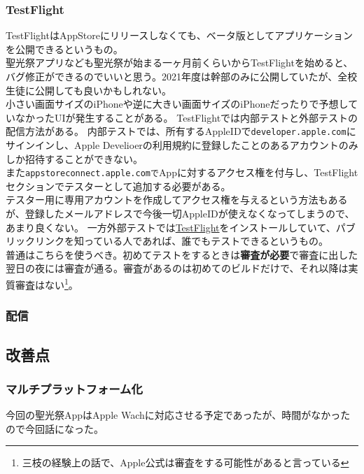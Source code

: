 \documentclass[dvipdfmx,jb5]{jarticle}
\newcommand{\impact}[1]{\textbf{\gtfamily #1}}
\newcommand{\link}[2]{\href{#2}{#1}}
\begin{document}
  \subsubsection{TestFlight}\label{sec:TestFlight}
  TestFlightはAppStoreにリリースしなくても、ベータ版としてアプリケーションを公開できるというもの。\\
  聖光祭アプリなども聖光祭が始まる一ヶ月前くらいからTestFlightを始めると、バグ修正ができるのでいいと思う。2021年度は幹部のみに公開していたが、全校生徒に公開しても良いかもしれない。\\
  小さい画面サイズのiPhoneや逆に大きい画面サイズのiPhoneだったりで予想していなかったUIが発生することがある。
  TestFlightでは内部テストと外部テストの配信方法がある。
  内部テストでは、所有するAppleIDで\texttt{developer.apple.com}にサインインし、Apple Develioerの利用規約に登録したことのあるアカウントのみしか招待することができない。\\
  また\texttt{appstoreconnect.apple.comで}Appに対するアクセス権を付与し、TestFlightセクションでテスターとして追加する必要がある。\\
  テスター用に専用アカウントを作成してアクセス権を与えるという方法もあるが、登録したメールアドレスで今後一切AppleIDが使えなくなってしまうので、あまり良くない。
  一方外部テストでは\link{TestFlight}{https://itunes.apple.com/jp/app/testflight/id899247664?mt=8}をインストールしていて、パブリックリンクを知っている人であれば、誰でもテストできるというもの。\\
  普通はこちらを使うべき。初めてテストをするときは\impact{審査が必要}で審査に出した翌日の夜には審査が通る。審査があるのは初めてのビルドだけで、それ以降は実質審査はない\footnote{三枝の経験上の話で、Apple公式は審査をする可能性があると言っている}。\\
  \subsubsection{配信}
 \subsection{改善点}
  \subsubsection{マルチプラットフォーム化}
  今回の聖光祭AppはApple Wachに対応させる予定であったが、時間がなかったので今回話になった。
\end{document}
